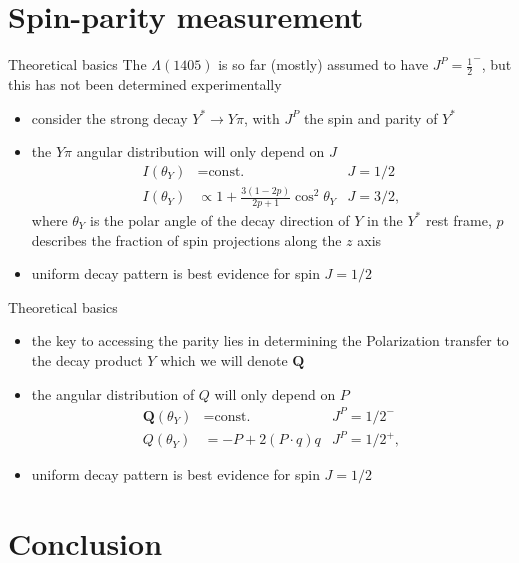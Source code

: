 \documentclass[11pt,aspectratio=1610,dvipsnames]{beamer}
\begin{document}
\section{Spin-parity measurement}
\begin{frame}{Theoretical basics}
	The $\Lambda(1405)$ is so far (mostly) assumed to have $J^P=\frac{1}{2}^-$, but this has not been determined experimentally
	\begin{tcolorbox}[colback=black!10,colframe=gray!20!black,title=Measuring spin] 
		\begin{itemize}
			\item consider the strong decay $Y^*\to Y\pi$, with $J^P$ the spin and parity of $Y^*$
			\item the $Y\pi$ angular distribution will only depend on $J$
			\begin{align*}
				I(\theta_Y)&=\text{const.} & J=1/2\\
				I(\theta_Y)&\propto 1+\frac{3(1-2p)}{2p+1}\cos^2\theta_Y& J=3/2,
			\end{align*}
			where $\theta_Y$ is the polar angle of the decay direction of $Y$ in the $Y^*$ rest frame, $p$ describes the fraction of spin projections along the $z$ axis 
			\item uniform decay pattern is best evidence for spin $J=1/2$
			
		\end{itemize}
	\end{tcolorbox}
	\begin{flushright}
	\end{flushright}
	
\end{frame}
\begin{frame}{Theoretical basics}
	\begin{tcolorbox}[colback=black!10,colframe=gray!20!black,title=Measuring parity] 
		\begin{itemize}
			\item the key to accessing the parity lies in determining the Polarization transfer to the decay product $Y$ which we will denote $\mathbf{Q}$
			\item the angular distribution of $Q$ will only depend on $P$
			\begin{align*}
				\mathbf{Q}(\theta_Y)&=\text{const.} & J^P=1/2^-\\
				Q(\theta_Y)&=-P+2(P\cdot q)q & J^P=1/2^+,
			\end{align*}
			
			\item uniform decay pattern is best evidence for spin $J=1/2$
			
		\end{itemize}
	\end{tcolorbox}
	\begin{flushright}
	\end{flushright}
	
\end{frame}

\section{Conclusion}
\end{document}
